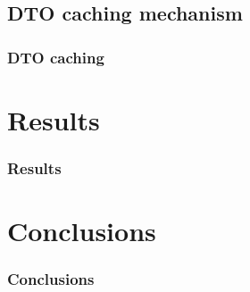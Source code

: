 \documentclass{beamer}
\begin{document}
\subsection{DTO caching mechanism}
\begin{frame}
\frametitle{DTO caching}
\end{frame}

\section{Results}
\begin{frame}
\frametitle{Results}
\end{frame}

\section{Conclusions}
\begin{frame}
\frametitle{Conclusions}
\end{frame}
\end{document}
